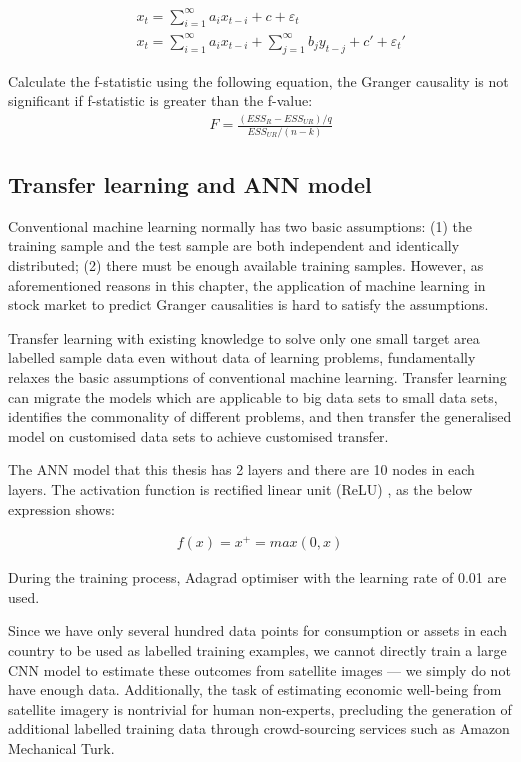 \begin{eqnarray}
&&	x_t=\sum_{i=1}^{\infty}a_ix_{t-i}+c+\varepsilon_{t}\\
&&x_t=\sum_{i=1}^{\infty}a_ix_{t-i}+\sum_{j=1}^{\infty}b_jy_{t-j}+c'+\varepsilon_{t}'
\end{eqnarray}

Calculate the f-statistic using the following equation, the Granger causality is not significant if f-statistic is greater than the f-value:
\begin{eqnarray}
&&	F=\frac{(ESS_R-ESS_{UR})/q}{ESS_{UR}/(n-k)}
\end{eqnarray}

\subsection{Transfer learning and ANN model}
\label{sbs:transfer}
Conventional machine learning normally has two basic assumptions: (1) the training sample and the test sample are both independent and identically distributed; (2) there must be enough available training samples. However, as aforementioned reasons in this chapter, the application of machine learning in stock market to predict Granger causalities is hard to satisfy the assumptions.

Transfer learning with existing knowledge to solve only one small target area labelled sample data even without data of learning problems, fundamentally relaxes the basic assumptions of conventional machine learning. Transfer learning can migrate the models which are applicable to big data sets to small data sets, identifies the commonality of different problems, and then transfer the generalised model on customised data sets to achieve customised transfer.

The ANN model that this thesis has 2 layers and there are 10 nodes in each layers.  The activation function is rectified linear unit (ReLU) \cite{hahnloser2000digital}, as the below expression shows:

\begin{eqnarray}
f\left(x\right)=x^+=max\left(0,x\right)
\end{eqnarray}

During the training process, Adagrad optimiser \cite{duchi2011adaptive} with the learning rate of 0.01 are used.

Since we have only several hundred data points for consumption or assets in each country to be used as labelled training examples, we cannot directly train a large CNN model to estimate these outcomes from satellite images — we simply do not have enough data. Additionally, the task of estimating economic well-being from satellite imagery is nontrivial for human non-experts, precluding the generation of additional labelled training data through crowd-sourcing services such as Amazon Mechanical Turk.

